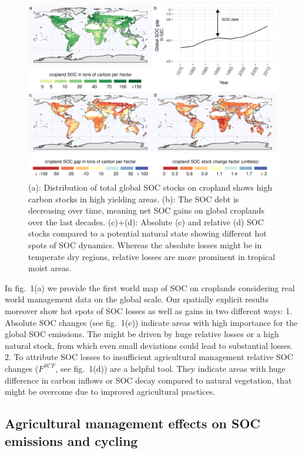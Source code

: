 \documentclass[gc, manuscript]{copernicus}
\begin{document}
\begin{figure}[H]
\includegraphics[width=18cm]{../ResultNotebooks/Output/Images/4panelfigure} \caption{(a): Distribution of total global SOC stocks on cropland shows high carbon stocks in high yielding areas. (b): The SOC debt is decreasing over time, meaning net SOC gains on global croplands over the last decades. (c)+(d): Absolute (c) and relative (d) SOC stocks compared to a potential natural state showing different hot spots of SOC dynamics. Whereas the absolute losses might be in temperate dry regions, relative losses are more prominent in tropical moist areas.}\label{fig:SOCmaps}
\end{figure}

In fig.~1(a) we provide the first world map of SOC on croplands considering real world management data on the global scale. Our spatially explicit results moreover show hot spots of SOC losses as well as gains in two different ways:
1. Absolute SOC changes (see fig.~1(c)) indicate areas with high importance for the global SOC emissions. The might be driven by huge relative losses or a high natural stock, from which even small deviations could lead to substantial losses.
2. To attribute SOC losses to insufficient agricultural management relative SOC changes (\(F^{SCF}\), see fig.~1(d)) are a helpful tool. They indicate areas with huge difference in carbon inflows or SOC decay compared to natural vegetation, that might be overcome due to improved agricultural practices.

\hypertarget{agricultural-management-effects-on-soc-emissions-and-cycling}{%
\subsection{Agricultural management effects on SOC emissions and cycling}\label{agricultural-management-effects-on-soc-emissions-and-cycling}}
\end{document}

